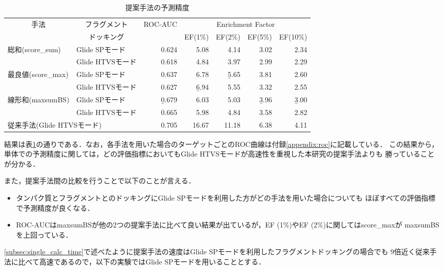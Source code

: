 \begin{table}[htb] \centering
	\caption{提案手法の予測精度}
	\label{table:single_accuracy}
	\begin{tabular}{l|l|rrrrr}
	\hline
	\multicolumn{1}{c|}{\multirow{2}{*}{手法}}	&\multicolumn{1}{c|}{フラグメント}		&\multirow{2}{*}{ROC-AUC}	&\multicolumn{4}{c}{Enrichment Factor}	\\
																	&\multicolumn{1}{c|}{ドッキング}		&						&EF(1\%)	&EF(2\%)	&EF(5\%)	&EF(10\%)	\\ \hline
	\multirow{2}{*}{総和(score\_sum)}			&Glide SPモード								&0.624					&5.08	&4.14	&3.02	&2.34		\\
											&Glide HTVSモード							&0.618					&4.84	&3.97	&2.99	&2.29		\\
	\multirow{2}{*}{最良値(score\_max)}		&Glide SPモード								&0.637					&6.78	&\b{5.65}	&3.81	&2.60		\\
											&Glide HTVSモード							&0.627					&\b{6.94}	&5.55	&3.32	&2.55		\\
	\multirow{2}{*}{線形和(maxsumBS)}		&Glide SPモード								&\b{0.679}				&6.03	&5.03	&\b{3.96}	&\b{3.00}		\\
											&Glide HTVSモード							&0.665					&5.98	&4.84	&3.58	&2.82		\\ \hline
	\multicolumn{2}{l|}{従来手法(Glide HTVSモード)}											&0.705					&16.67	&11.18	&6.38	&4.11		\\ \hline
	\end{tabular}
\end{table}

結果は表\ref{table:single_accuracy}の通りである．なお，各手法を用いた場合のターゲットごとのROC曲線は付録\ref{appendix:roc}に記載している．
この結果から，単体での予測精度に関しては，どの評価指標においてもGlide HTVSモードが高速性を重視した本研究の提案手法よりも
勝っていることが分かる．

また，提案手法間の比較を行うことで以下のことが言える．
\begin{itemize}
\item タンパク質とフラグメントとのドッキングにGlide SPモードを利用した方がどの手法を用いた場合についても
	ほぼすべての評価指標で予測精度が良くなる．
\item ROC-AUCはmaxsumBSが他の2つの提案手法に比べて良い結果が出ているが，EF (1\%)やEF (2\%)に関してはscore\_maxが
	maxsumBSを上回っている．
\end{itemize}
\ref{subsec:single_calc_time}で述べたように提案手法の速度はGlide SPモードを利用したフラグメントドッキングの場合でも
9倍近く従来手法に比べて高速であるので，以下の実験ではGlide SPモードを用いることとする．

